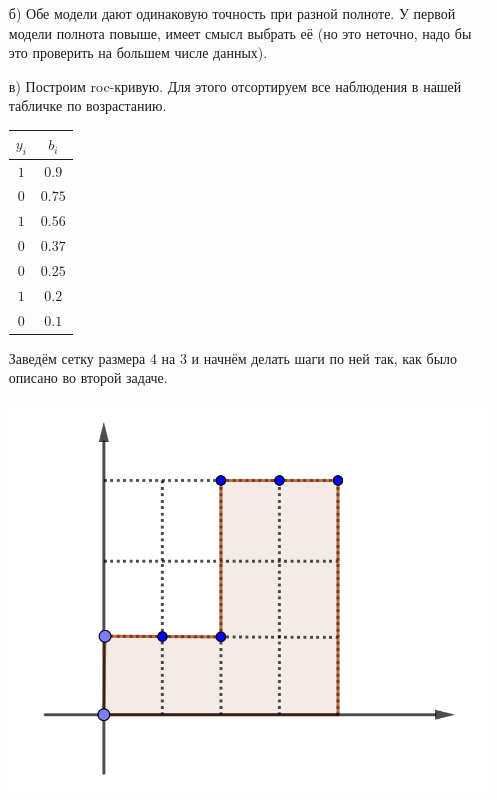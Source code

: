 \documentclass[12pt, a4paper, oneside]{article}
\begin{document}
{\begin{enumerate}
		Считаем для обоих случаев точность и полноту. 
		
		\begin{equation} 
		\begin{aligned}
		&Precision_1 = 0.5     \qquad &Recall_1 = 0.66  \\ 
		&Precision_2 = 0.5  \qquad &Recall_2 =  0.33   \\ 
		\end{aligned}
		\end{equation} 
		
		\item[б)]  Обе модели дают одинаковую точность при разной полноте. У первой модели полнота повыше, имеет смысл выбрать её (но это неточно, надо бы это проверить на большем числе данных). 
		
		\item[в)] Построим roc-кривую. Для этого отсортируем все наблюдения в нашей табличке по возрастанию.
		
		\begin{center}
			\begin{tabular}{c|c}
				$y_i$ & $b_i$ \\
				\hline
				$1$  & $0.9$ \\
				$0$ & $0.75$ \\
				$1$ & $0.56$ \\
				$0$ & $0.37$ \\	
				$0$ & $0.25$ \\			
				$1$ & $0.2$ \\												
				$0$ & $0.1$ \\
			\end{tabular}
		\end{center}
		
		Заведём сетку размера 4 на 3 и начнём делать шаги по ней так, как было описано во второй задаче.
		
		\begin{center}
			\includegraphics[width=.4\paperwidth]{roc_auc2.png}
		\end{center}
		

\end{enumerate}}
\end{document}
